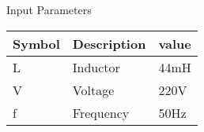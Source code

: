 \setlength{\arrayrulewidth}{0.3mm}
\setlength{\tabcolsep}{12pt}
\renewcommand{\arraystretch}{1.3}


\begin{center}
\caption{Input Parameters}
\begin{tabular}{ |p{1.5cm}|p{1.5cm}|p{1.5cm}|  }

\hline
 {Symbol}&{Description} & {value}\\
\hline
L & Inductor & 44mH\\
\hline
V & Voltage  & 220V\\
\hline
f & Frequency & 50Hz \\
\hline

\end{tabular}
\end{center}
